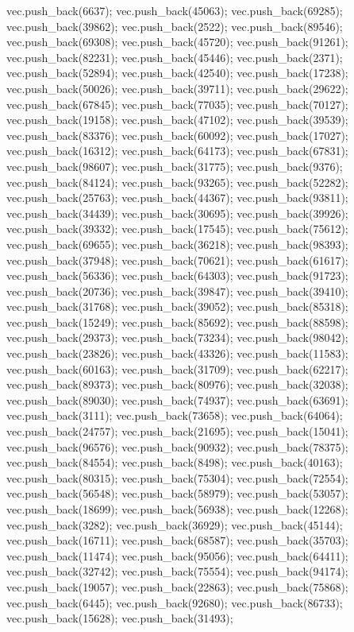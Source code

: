 vec.push_back(6637);
vec.push_back(45063);
vec.push_back(69285);
vec.push_back(39862);
vec.push_back(2522);
vec.push_back(89546);
vec.push_back(69308);
vec.push_back(45720);
vec.push_back(91261);
vec.push_back(82231);
vec.push_back(45446);
vec.push_back(2371);
vec.push_back(52894);
vec.push_back(42540);
vec.push_back(17238);
vec.push_back(50026);
vec.push_back(39711);
vec.push_back(29622);
vec.push_back(67845);
vec.push_back(77035);
vec.push_back(70127);
vec.push_back(19158);
vec.push_back(47102);
vec.push_back(39539);
vec.push_back(83376);
vec.push_back(60092);
vec.push_back(17027);
vec.push_back(16312);
vec.push_back(64173);
vec.push_back(67831);
vec.push_back(98607);
vec.push_back(31775);
vec.push_back(9376);
vec.push_back(84124);
vec.push_back(93265);
vec.push_back(52282);
vec.push_back(25763);
vec.push_back(44367);
vec.push_back(93811);
vec.push_back(34439);
vec.push_back(30695);
vec.push_back(39926);
vec.push_back(39332);
vec.push_back(17545);
vec.push_back(75612);
vec.push_back(69655);
vec.push_back(36218);
vec.push_back(98393);
vec.push_back(37948);
vec.push_back(70621);
vec.push_back(61617);
vec.push_back(56336);
vec.push_back(64303);
vec.push_back(91723);
vec.push_back(20736);
vec.push_back(39847);
vec.push_back(39410);
vec.push_back(31768);
vec.push_back(39052);
vec.push_back(85318);
vec.push_back(15249);
vec.push_back(85692);
vec.push_back(88598);
vec.push_back(29373);
vec.push_back(73234);
vec.push_back(98042);
vec.push_back(23826);
vec.push_back(43326);
vec.push_back(11583);
vec.push_back(60163);
vec.push_back(31709);
vec.push_back(62217);
vec.push_back(89373);
vec.push_back(80976);
vec.push_back(32038);
vec.push_back(89030);
vec.push_back(74937);
vec.push_back(63691);
vec.push_back(3111);
vec.push_back(73658);
vec.push_back(64064);
vec.push_back(24757);
vec.push_back(21695);
vec.push_back(15041);
vec.push_back(96576);
vec.push_back(90932);
vec.push_back(78375);
vec.push_back(84554);
vec.push_back(8498);
vec.push_back(40163);
vec.push_back(80315);
vec.push_back(75304);
vec.push_back(72554);
vec.push_back(56548);
vec.push_back(58979);
vec.push_back(53057);
vec.push_back(18699);
vec.push_back(56938);
vec.push_back(12268);
vec.push_back(3282);
vec.push_back(36929);
vec.push_back(45144);
vec.push_back(16711);
vec.push_back(68587);
vec.push_back(35703);
vec.push_back(11474);
vec.push_back(95056);
vec.push_back(64411);
vec.push_back(32742);
vec.push_back(75554);
vec.push_back(94174);
vec.push_back(19057);
vec.push_back(22863);
vec.push_back(75868);
vec.push_back(6445);
vec.push_back(92680);
vec.push_back(86733);
vec.push_back(15628);
vec.push_back(31493);
